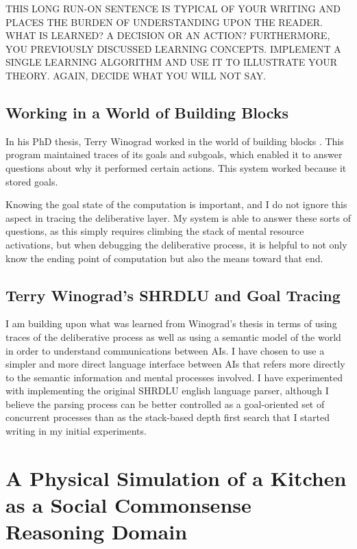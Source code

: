 THIS LONG RUN-ON SENTENCE IS TYPICAL OF YOUR WRITING AND PLACES THE BURDEN OF UNDERSTANDING UPON THE READER. WHAT IS LEARNED? A DECISION OR AN ACTION? FURTHERMORE, YOU PREVIOUSLY DISCUSSED LEARNING CONCEPTS. IMPLEMENT A SINGLE LEARNING ALGORITHM AND USE IT TO ILLUSTRATE YOUR THEORY. AGAIN, DECIDE WHAT YOU WILL NOT SAY.


\subsection{Working in a World of Building Blocks}

In his PhD thesis, Terry Winograd worked in the world of building
blocks \citep{winograd:1970}.  This program maintained traces of its
goals and subgoals, which enabled it to answer questions about why it
performed certain actions.  This system worked because it stored
goals.

Knowing the goal state of the computation is important, and I do not
ignore this aspect in tracing the deliberative layer.  My system is
able to answer these sorts of questions, as this simply requires
climbing the stack of mental resource activations, but when debugging
the deliberative process, it is helpful to not only know the ending
point of computation but also the means toward that end.

\subsection{Terry Winograd's SHRDLU and Goal Tracing}

I am building upon what was learned from Winograd's thesis
\citep{winograd:1970} in terms of using traces of the deliberative
process as well as using a semantic model of the world in order to
understand communications between AIs.  I have chosen to use a
simpler and more direct language interface between AIs that refers
more directly to the semantic information and mental processes
involved.  I have experimented with implementing the original SHRDLU
english language parser, although I believe the parsing process can be
better controlled as a goal-oriented set of concurrent processes than
as the stack-based depth first search that I started writing in my
initial experiments.


\section{A Physical Simulation of a Kitchen as a Social Commonsense Reasoning Domain}

